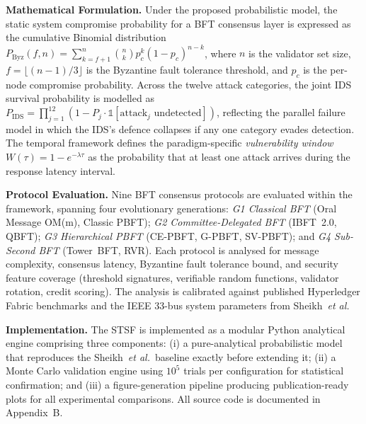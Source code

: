\documentclass[12pt, oneside, a4paper]{report}
\theoremstyle{definition}
\theoremstyle{remark}
\begin{document}
\medskip

\noindent\textbf{Mathematical Formulation.}
Under the proposed probabilistic model, the static system compromise probability for a BFT consensus layer is expressed as the cumulative Binomial distribution $P_{\mathrm{Byz}}(f,n) = \sum_{k=f+1}^{n} \binom{n}{k} p_c^k (1-p_c)^{n-k}$, where $n$ is the validator set size, $f = \lfloor(n-1)/3\rfloor$ is the Byzantine fault tolerance threshold, and $p_c$ is the per-node compromise probability. Across the twelve attack categories, the joint IDS survival probability is modelled as $P_{\mathrm{IDS}} = \prod_{j=1}^{12}(1 - P_j \cdot \mathds{1}[\text{attack}_j \text{ undetected}])$, reflecting the parallel failure model in which the IDS's defence collapses if any one category evades detection. The temporal framework defines the paradigm-specific \emph{vulnerability window} $W(\tau) = 1 - e^{-\lambda \tau}$ as the probability that at least one attack arrives during the response latency interval.

\medskip

\noindent\textbf{Protocol Evaluation.}
Nine BFT consensus protocols are evaluated within the framework, spanning four evolutionary generations: \textit{G1 Classical BFT} (Oral Message OM(m), Classic PBFT); \textit{G2 Committee-Delegated BFT} (IBFT~2.0, QBFT); \textit{G3 Hierarchical PBFT} (CE-PBFT, G-PBFT, SV-PBFT); and \textit{G4 Sub-Second BFT} (Tower~BFT, RVR). Each protocol is analysed for message complexity, consensus latency, Byzantine fault tolerance bound, and security feature coverage (threshold signatures, verifiable random functions, validator rotation, credit scoring). The analysis is calibrated against published Hyperledger Fabric benchmarks and the IEEE 33-bus system parameters from Sheikh~\emph{et al.}

\medskip

\noindent\textbf{Implementation.}
The STSF is implemented as a modular Python analytical engine comprising three components: (i) a pure-analytical probabilistic model that reproduces the Sheikh~\emph{et al.}\ baseline exactly before extending it; (ii) a Monte Carlo validation engine using $10^5$ trials per configuration for statistical confirmation; and (iii) a figure-generation pipeline producing publication-ready plots for all experimental comparisons. All source code is documented in Appendix~B.

\medskip
\end{document}
